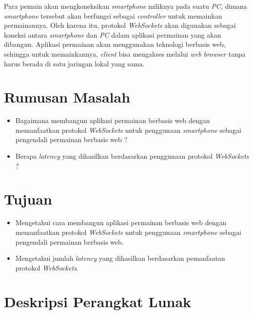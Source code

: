 \documentclass[a4paper,twoside]{article}
\begin{document}
Para pemain akan mengkoneksikan \textit{smartphone} miliknya pada suatu \textit{PC}, dimana \textit{smartphone} tersebut akan berfungsi sebagai \textit{controller} untuk memainkan permainannya. Oleh karena itu, protokol \textit{WebSockets} akan digunakan sebagai koneksi antara \textit{smartphone} dan \textit{PC} dalam aplikasi permainan yang akan dibangun. Aplikasi permainan akan menggunakan teknologi berbasis web, sehingga untuk memainkannya, \textit{client} bisa mengakses melalui \textit{web browser} tanpa harus berada di satu jaringan lokal yang sama.

\section{Rumusan Masalah}
\begin{itemize}
	\item Bagaimana membangun aplikasi permainan berbasis web dengan memanfaatkan protokol \textit{WebSockets} untuk penggunaan \textit{smartphone} sebagai pengendali permainan berbasis web ?
	\item Berapa \textit{latency} yang dihasilkan berdasarkan penggunaan protokol \textit{WebSockets} ? 
\end{itemize}

\section{Tujuan}
\begin{itemize}
	\item Mengetahui cara membangun aplikasi permainan berbasis web dengan memanfaatkan protokol \textit{WebSockets} untuk penggunaan \textit{smartphone} sebagai pengendali permainan berbasis web.
	\item Mengetahui jumlah \textit{latency} yang dihasilkan berdasarkan pemanfaatan protokol \textit{WebSockets}.
\end{itemize}

\section{Deskripsi Perangkat Lunak}
\end{document}
